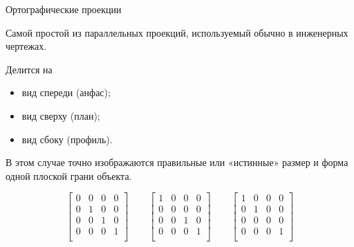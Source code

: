 \documentclass{beamer}
\begin{document}
	\begin{frame}{Ортографические проекции}
	
		Самой простой из параллельных проекций, используемый обычно в инженерных чертежах. 

		Делится на 
		\begin{itemize}
			\item вид спереди (анфас);
			\item вид сверху (план);
			\item вид сбоку (профиль).
		\end{itemize}
		
		В этом случае точно изображаются правильные или «истинные» размер и форма одной плоской грани объекта.

		\[
			\begin{bmatrix}
				0 & 0 & 0 & 0 \\
				0 & 1 & 0 & 0 \\
				0 & 0 & 1 & 0 \\
				0 & 0 & 0 & 1 \\
			 \end{bmatrix}	
			 \qquad
		 \begin{bmatrix}
			1 & 0 & 0 & 0 \\
			0 & 0 & 0 & 0 \\
			0 & 0 & 1 & 0 \\
			0 & 0 & 0 & 1 \\
		 \end{bmatrix}
		 \qquad
		 \begin{bmatrix}
			 1 & 0 & 0 & 0 \\
			 0 & 1 & 0 & 0 \\
			 0 & 0 & 0 & 0 \\
			 0 & 0 & 0 & 1 \\
		 \end{bmatrix}
	 \]

	
	\end{frame}
\end{document}
